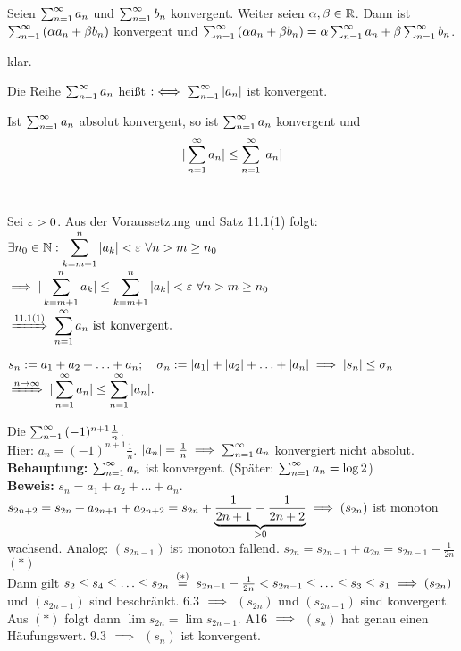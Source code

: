 \documentclass[a4paper,twoside,DIV15,BCOR12mm]{scrbook}
\begin{document}
\begin{satz}
Seien $\sum_{n=1}^{\infty}{a_n}$ und $\sum_{n=1}^{\infty}{b_n}$ konvergent. Weiter seien $\alpha,\beta \in \mathbb{R}$. Dann ist $\sum_{n=1}^{\infty}{(\alpha a_n+\beta b_n)}$ konvergent und $\sum_{n=1}^{\infty}{(\alpha a_n+\beta b_n)} = \alpha\sum_{n=1}^{\infty}{a_n}+\beta\sum_{n=1}^{\infty}{b_n}$.
\end{satz}

\begin{beweis}
klar.
\end{beweis}

\begin{definition}
Die Reihe $\sum_{n=1}^{\infty}{a_n}$ heißt  $:\iff \sum_{n=1}^{\infty}{|a_n|}$ ist konvergent. 
\end{definition}

\begin{satz}
Ist $\sum_{n=1}^{\infty}{a_n}$ absolut konvergent, so ist $\sum_{n=1}^{\infty}{a_n}$ konvergent und
$$|\sum_{n=1}^{\infty}{a_n}| \le \sum_{n=1}^{\infty}{|a_n|}$$
\ 
\end{satz}

\begin{beweis}
Sei $\varepsilon > 0$. Aus der Voraussetzung und Satz 11.1(1) folgt:\\
$\displaystyle{\exists n_0\in\ensuremath{\mathbb{N}}: \sum_{k=m+1}^{n}{|a_k|} < \varepsilon\ \forall n>m \ge n_0}$\\
$\displaystyle{\ensuremath{\implies}|\sum_{k=m+1}^{n}{a_k}| \le \sum_{k=m+1}^{n}{|a_k|} < \varepsilon\ \forall n>m \ge n_0}$\\
$\displaystyle{\folgtnach{11.1(1)} \areihe \text{ ist konvergent.}}$

$\displaystyle{s_n := a_1+a_2+\ldots+a_n;\quad\sigma_n := |a_1|+|a_2|+\ldots+|a_n| \ensuremath{\implies}|s_n|\le\sigma_n}$\\
$\displaystyle{\folgtwegen{n\to\infty} |\areihe| \le \reihe{|a_n|}}.$
\end{beweis}

\begin{beispiel}
Die  $\sum_{n=1}^{\infty}{(-1)^{n+1} \frac{1}n}$.\\
Hier: $a_n = (-1)^{n+1}\frac{1}{n}$. $|a_n| = \frac{1}{n} \implies \sum_{n=1}^{\infty}{a_n}$ konvergiert nicht absolut.\\
\textbf{Behauptung:} $\sum_{n=1}^{\infty}{a_n}$ ist konvergent. (Später: $\sum_{n=1}^{\infty}{a_n} = \log 2$)\\
\textbf{Beweis:} $s_n = a_1 + a_2 + \ldots + a_n$. \\
$s_{2n+2} = s_{2n} + a_{2n+1} + a_{2n+2} = s_{2n} + \underbrace{\frac{1}{2n+1} - \frac{1}{2n+2}}_{>0} \implies (s_{2n})$ ist monoton wachsend. Analog: $(s_{2n-1})$ ist monoton fallend. 
$s_{2n} = s_{2n-1} + a_{2n} = s_{2n-1} - \frac{1}{2n}$ $(*)$\\
Dann gilt $s_2 \le s_4 \le \ldots \le s_{2n} \gleichwegen{(*)} s_{2n-1} - \frac{1}{2n} < s_{2n-1} \le \ldots \le s_3 \le s_1 \folgt (s_{2n})$ und $(s_{2n-1})$ sind beschränkt. 6.3 $\implies$ $(s_{2n})$ und $(s_{2n-1})$ sind konvergent. Aus $(*)$ folgt dann $\lim s_{2n} = \lim s_{2n-1}$. A16 $\implies$ $(s_n)$ hat genau einen Häufungswert. 9.3 $\implies$ $(s_n)$ ist konvergent.
\end{beispiel}
\end{document}

